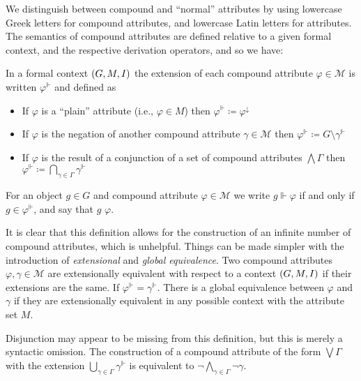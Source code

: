We distinguish between compound and ``normal'' attributes by using lowercase Greek letters for compound attributes, and lowercase
Latin letters for attributes. The semantics of compound attributes are defined relative to a given formal context, and the
respective derivation operators, and so we have:

\begin{definition}
	\label{definition:compound-attributes-semantics}

	In a formal context $(G,M,\mathrel{I})$ the extension of each compound attribute $\varphi \in \mathcal{M}$ is written
	$\varphi^{\Vdash}$ and defined as
	\begin{itemize}
		\item If $\varphi$ is a ``plain'' attribute (i.e., $\varphi \in M$) then $\varphi^{\Vdash}\coloneq \varphi^{\downarrow}$

		\item If $\varphi$ is the negation of another compound attribute $\gamma \in \mathcal{M}$ then $\varphi^{\Vdash}\coloneq
			G \setminus \gamma^{\Vdash}$

		\item If $\varphi$ is the result of a conjunction of a set of compound attributes $\bigwedge \Gamma$ then $\varphi^{\Vdash}
			\coloneq \underset{\gamma \in \Gamma}\bigcap \gamma^{\Vdash}$
	\end{itemize}
	For an object $g\in G$ and compound attribute $\varphi \in \mathcal{M}$ we write $g \Vdash \varphi$ if and only if
	$g \in \varphi^{\Vdash}$, and say that $g$  $\varphi$.
\end{definition}

It is clear that this definition allows for the construction of an infinite number of compound attributes, which is
unhelpful. Things can be made simpler with the introduction of \textit{extensional} and \textit{global equivalence}. Two
compound attributes $\varphi, \gamma \in \mathcal{M}$ are extensionally equivalent with respect to a context $(G,M,\mathrel{I})$ if
their extensions are the same. If $\varphi^{\Vdash}= \gamma^{\Vdash}$. There is a global equivalence between $\varphi$
and $\gamma$ if they are extensionally equivalent in any possible context with the attribute set $M$.

Disjunction may appear to be missing from this definition, but this is merely a syntactic omission. The construction of
a compound attribute of the form $\bigvee \Gamma$ with the extension
$\underset{\gamma \in \Gamma}\bigcup \gamma^{\Vdash}$ is equivalent to
$\neg \underset{\gamma \in \Gamma}\bigwedge \neg \gamma$.

